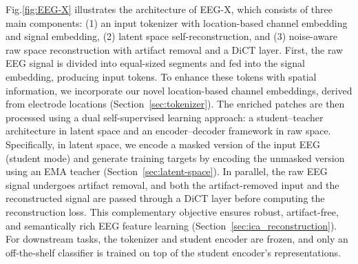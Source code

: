 \documentclass{article} %
\begin{document}
Fig.\ref{fig:EEG-X} illustrates the architecture of EEG-X, which consists of three main components: (1) an input tokenizer with location-based channel embedding and signal embedding, (2) latent space self-reconstruction, and (3) noise-aware raw space reconstruction with artifact removal and a DiCT layer. First, the raw EEG signal %
is divided into equal-sized segments and fed into the signal embedding, producing input tokens. To enhance these tokens with spatial information, we incorporate our novel location-based channel embeddings, derived from electrode locations (Section~\ref{sec:tokenizer}). The enriched patches are then processed using a dual self-supervised learning approach: a student–teacher architecture in latent space and an encoder–decoder framework in raw space. Specifically, in latent space, we encode a masked version of the input EEG (student mode) and generate training targets by encoding the unmasked version using an EMA teacher (Section~\ref{sec:latent-space}). In parallel, the raw EEG signal undergoes artifact removal, and both the artifact-removed input and the reconstructed signal are passed through a DiCT layer before computing the reconstruction loss. This complementary objective ensures robust, artifact-free, and semantically rich EEG feature learning (Section~\ref{sec:ica_reconstruction}). For downstream tasks, the tokenizer and student encoder are frozen, and only an off-the-shelf classifier is trained on top of the student encoder’s representations.



\vspace{-0.2cm}
\end{document}
